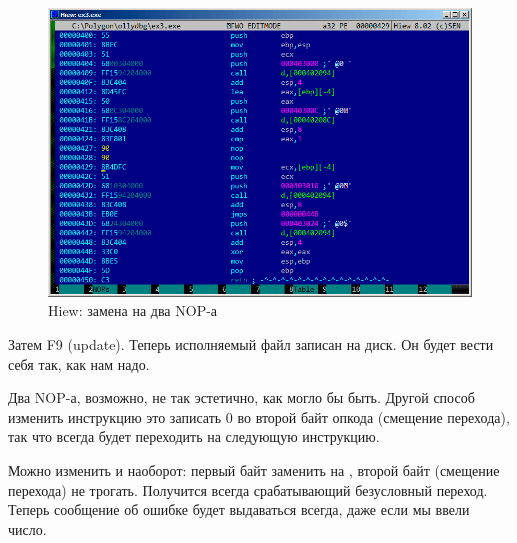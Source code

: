 \begin{figure}[H]
\centering
\includegraphics[scale=\FigScale]{patterns/04_scanf/3_checking_retval/hiew_2.png}
\caption{Hiew: замена  на два \ac{NOP}-а}
\label{fig:scanf_ex3_hiew_2}
\end{figure}

Затем F9 (update). Теперь исполняемый файл записан на диск. Он будет вести себя так, как нам надо.

Два \ac{NOP}-а, возможно, не так эстетично, как могло бы быть.
Другой способ изменить инструкцию это записать 0 во второй байт опкода (смещение перехода),
так что  всегда будет переходить на следующую инструкцию.

Можно изменить и наоборот: первый байт заменить на , второй байт (смещение перехода) не трогать.
Получится всегда срабатывающий безусловный переход.
Теперь сообщение об ошибке будет выдаваться всегда, даже если мы ввели число.

